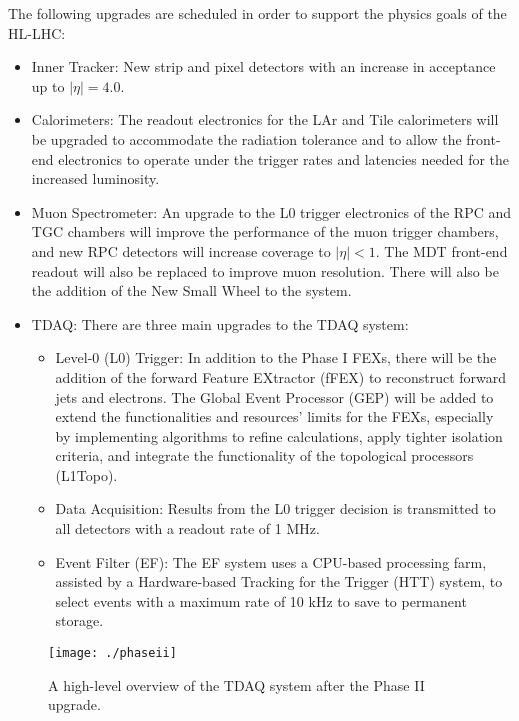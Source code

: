 The following upgrades are scheduled in order to support the physics goals of the HL-LHC: %
\begin{itemize}
	\item Inner Tracker: New strip and pixel detectors with an increase in acceptance up to $|\eta| = 4.0$. 
	\item Calorimeters: The readout electronics for the LAr and Tile calorimeters will be upgraded to accommodate the radiation tolerance and to allow the front-end electronics to operate under the trigger rates and latencies needed for the increased luminosity.
	\item Muon Spectrometer: An upgrade to the L0 trigger electronics of the RPC and TGC chambers will improve the performance of the muon trigger chambers, and new RPC detectors will increase coverage to $|\eta|<1$.  The MDT front-end readout will also be replaced to improve muon resolution.  There will also be the addition of the New Small Wheel to the system.
	\item TDAQ: There are three main upgrades to the TDAQ system:
	\begin{itemize}
		\item Level-0 (L0) Trigger: In addition to the Phase I FEXs, there will be the addition of the forward Feature EXtractor (fFEX) to reconstruct forward jets and electrons.  The Global Event Processor (GEP) will be added to extend the functionalities and resources' limits for the FEXs, especially by implementing algorithms to refine calculations, apply tighter isolation criteria, and integrate the functionality of the topological processors (L1Topo).  
		\item Data Acquisition: Results from the L0 trigger decision is transmitted to all detectors with a readout rate of 1 MHz.  
		\item Event Filter (EF): The EF system uses a CPU-based processing farm, assisted by a Hardware-based Tracking for the Trigger (HTT) system, to select events with a maximum rate of 10 kHz to save to permanent storage.
	\end{itemize}
\end{itemize}

\begin{figure}[h!]
  \centering
	\texttt{[image: ./phaseii]}
\caption{\label{fig:PhaseIItdaq}{ A high-level overview of the TDAQ system after the Phase II upgrade. }} %
\end{figure}


